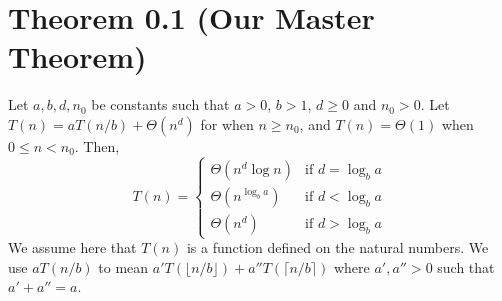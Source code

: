 \documentclass{article}
\begin{document}
\section*{Theorem 0.1 (Our Master Theorem)}
Let $a, b, d, n_0$ be constants such that $a > 0$, $b > 1$, $d \ge 0$ and $n_0 > 0$.
Let $T(n) = aT(n/b) + \Theta(n^d)$ for when $n \ge n_0$, and $T(n) = \Theta(1)$ when $0 \le n < n_0$. Then,
\[
T(n) = \begin{cases}
\Theta(n^d \log n) & \text{if } d = \log_b a \\
\Theta(n^{\log_b a}) & \text{if } d < \log_b a \\
\Theta(n^d) & \text{if } d > \log_b a
\end{cases}
\]
We assume here that $T(n)$ is a function defined on the natural numbers. We use $aT(n/b)$ to mean $a' T(\lfloor n/b \rfloor) + a'' T(\lceil n/b \rceil)$ where $a', a'' > 0$ such that $a' + a'' = a$.
\end{document}

